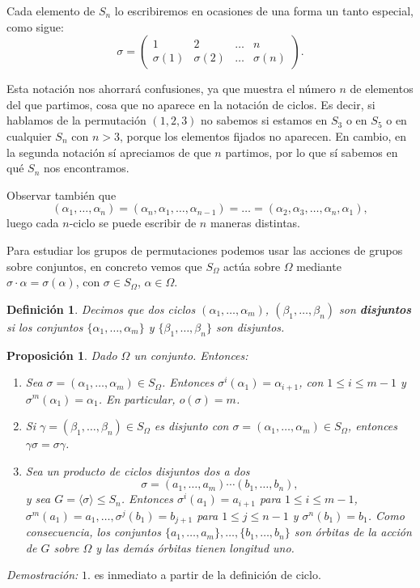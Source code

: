 \documentclass[12pt]{article}
\newtheorem{proposition}[theorem]{Proposición}
\newtheorem{definition}[theorem]{Definición}
\begin{document}
Cada elemento de $S_n$ lo escribiremos en ocasiones de una forma un tanto especial, como sigue: 
$$\sigma = \left(
\begin{matrix}
1 & 2 & \ldots & n \\
\sigma(1) & \sigma(2) & \ldots & \sigma(n)
\end{matrix}
\right).
$$

Esta notación nos ahorrará confusiones, ya que muestra el número $n$ de elementos del que partimos, cosa que no aparece en la notación de ciclos. Es decir, si hablamos de la permutación $(1,2,3)$ no sabemos si estamos en $S_3$ o en $S_5$ o en cualquier $S_n$ con $n>3$, porque los elementos fijados no aparecen. En cambio, en la segunda notación sí apreciamos de que $n$ partimos, por lo que sí sabemos en qué $S_n$ nos encontramos.

Observar también que $$(\alpha_1, \ldots, \alpha_n) = (\alpha_n, \alpha_1, \ldots, \alpha_{n-1}) = \ldots = (\alpha_2, \alpha_3, \ldots, \alpha_n, \alpha_1),$$ luego cada $n$-ciclo se puede escribir de $n$ maneras distintas.

Para estudiar los grupos de permutaciones podemos usar las acciones de grupos sobre conjuntos, en concreto vemos que $S_\Omega$ actúa sobre $\Omega$ mediante $\sigma \cdot \alpha = \sigma(\alpha)$, con $\sigma \in S_\Omega$, $\alpha \in \Omega$.

\begin{definition}Decimos que dos ciclos $(\alpha_1, \ldots, \alpha_m)$, $(\beta_1, \ldots, \beta_n)$ son \textbf{disjuntos} si los conjuntos $\lbrace \alpha_1, \ldots, \alpha_m \rbrace$ y $\lbrace \beta_1, \ldots, \beta_n \rbrace$ son disjuntos.
\end{definition}

\begin{proposition}Dado $\Omega$ un conjunto. Entonces:
\begin{enumerate}
\item Sea $\sigma = (\alpha_1, \ldots, \alpha_m) \in S_\Omega$. Entonces $\sigma^i(\alpha_1) = \alpha_{i+1}$, con $1 \leq i \leq m-1$ y $\sigma^m(\alpha_1)=\alpha_1$. En particular, $o(\sigma) = m$.
\item Si $\gamma = (\beta_1, \ldots, \beta_n) \in S_\Omega$ es disjunto con $\sigma = (\alpha_1, \ldots, \alpha_m) \in S_\Omega$, entonces $\gamma \sigma = \sigma \gamma$.
\item Sea un producto de ciclos disjuntos dos a dos $$\sigma= (a_{1}, \ldots, a_{m}) \cdots (b_{1}, \ldots, b_{n}),$$ y sea $G =\langle \sigma \rangle \leq S_{n}$. Entonces $\sigma^{i}(a_{1}) = a_{i+1}$ para $1 \leq i \leq m-1$, $\sigma^{m}(a_{1})=a_{1}, \ldots, \sigma^{j}(b_{1})=b_{j+1}$ para $1 \leq j \leq n-1$ y $\sigma^{n}(b_{1})=b_{1}$. Como consecuencia, los conjuntos $\lbrace a_{1}, \ldots, a_{m} \rbrace, \ldots, \lbrace b_{1}, \ldots, b_{n}\rbrace$ son órbitas de la acción de $G$ sobre $\Omega$ y las demás órbitas tienen longitud uno.
\end{enumerate}
\end{proposition}
\emph{Demostración: }$1.$ es inmediato a partir de la definición de ciclo. 
\end{document}

